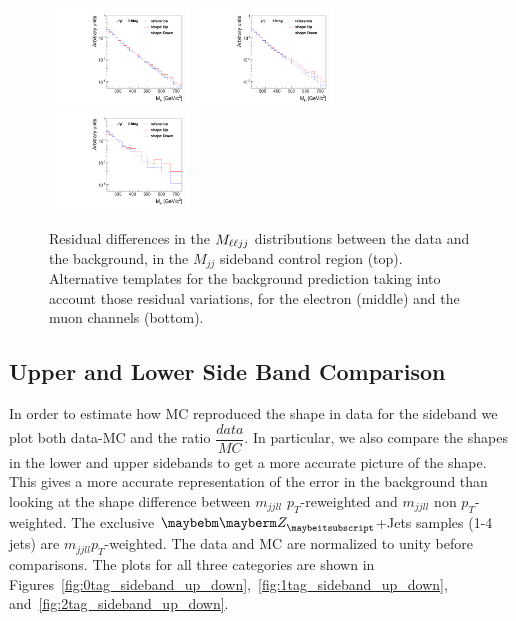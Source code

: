 \begin{figure}[htb]
\begin{center}
{}
\centerline{
\includegraphics[width=0.33\textwidth]{plots/SBres-mm-0b.pdf}
\includegraphics[width=0.33\textwidth]{plots/SBres-mm-1b.pdf}
\includegraphics[width=0.33\textwidth]{plots/SBres-mm-2b.pdf}
}
\caption{Residual differences in the $M_{\ell\ell jj}$ distributions between the data and the background, in the
$M_{jj}$ sideband control region (top). Alternative templates for the background prediction taking into account those residual variations, for the electron (middle) and the muon channels (bottom).    
}
\label{fig:sysshaperes}
\end{center}
\end{figure}



\subsection{Upper and Lower Side Band Comparison}

In order to estimate how MC reproduced the shape in data for the sideband we plot both data-MC and the ratio $\dfrac{data}{MC}$.  In particular, we also compare the shapes in the lower and upper sidebands to get a more accurate picture of the shape. This gives a more accurate representation of the error in the background than looking at the shape difference between $m_{jjll}$ $p_{T}$-reweighted and $m_{jjll}$ non $p_{T}$-weighted. The exclusive $\PZ$+Jets samples (1-4 jets) are $m_{jjll} p_{T}$-weighted.  The data and MC are normalized to unity before comparisons. The plots for all three categories are shown in Figures~\ref{fig:0tag_sideband_up_down},~\ref{fig:1tag_sideband_up_down}, and~\ref{fig:2tag_sideband_up_down}.  

